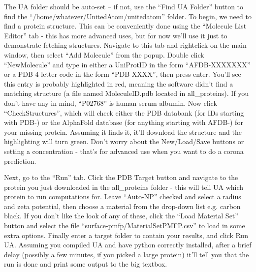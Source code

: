 \documentclass[10pt,a4paper,onecolumn]{report}
\begin{document}
 The UA folder should be auto-set  -- if not, use the ``Find UA Folder'' button to find the ``/home/whatever/UnitedAtom/unitedatom'' folder. To begin, we need to find a protein structure. This can be conveniently done using the ``Molecule List Editor'' tab - this has more advanced uses, but for now we'll use it just to demonstrate fetching structures. Navigate to this tab and rightclick on the main window, then select ``Add Molecule'' from the popup. Double click ``NewMolecule'' and type in either a UniProtID in the form ``AFDB-XXXXXXX'' or a PDB 4-letter code in the form ``PDB-XXXX'', then press enter. You'll see this entry is probably highlighted in red, meaning the software didn't find a matching structure (a file named MoleculeID.pdb located in all\_proteins). If you don't have any in mind, ``P02768'' is human serum albumin.  Now click ``CheckStructures'', which will check either the PDB databank (for IDs starting with PDB-) or the AlphaFold database (for anything starting with AFDB-) for your missing protein. Assuming it finds it, it'll download the structure and the highlighting will turn green. Don't worry about the New/Load/Save buttons or setting a concentration - that's for advanced use when you want to do a corona prediction.
 
Next, go to the ``Run'' tab. Click the PDB Target button and navigate to the protein you just downloaded in the all\_proteins folder - this will tell UA which protein to run computations for. Leave ``Auto-NP'' checked and select a radius and zeta potential, then choose a material from the drop-down list e.g. carbon black. If you don't like the look of any of these, click the ``Load Material Set'' button and select the file ``surface-pmfp/MaterialSetPMFP.csv'' to load in some extra options.  Finally enter a target folder to contain your results, and click Run UA. Assuming you compiled UA and have python correctly installed, after a brief delay (possibly a few minutes, if you picked a large protein) it'll tell you that the run is done and print some output to the big textbox.
\end{document}
